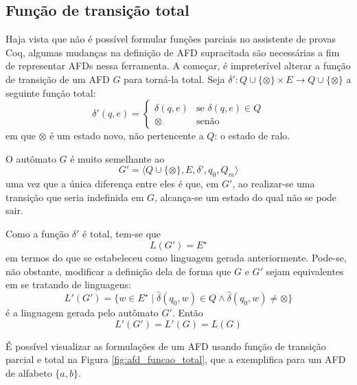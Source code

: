 \subsection{Função de transição total}

Haja vista que não é possível formular funções parciais no assistente de provas Coq, algumas mudanças na definição de AFD supracitada são necessárias a fim de representar AFDs nessa ferramenta. A começar, é impreterível alterar a função de transição de um AFD $G$ para torná-la total. Seja $\delta' : Q \cup \{ \otimes \} \times E \rightarrow Q \cup \{ \otimes \}$ a seguinte função total: $$\delta'(q, e) = \begin{cases}
\delta(q, e) & \text{se $\delta(q, e) \in Q$} \\
\otimes & \text{senão}
\end{cases}$$ em que $\otimes$ é um estado novo, não pertencente a $Q$: o estado de ralo.

O autômato $G$ é muito semelhante ao $$G' = \langle Q \cup \{ \otimes \}, E, \delta', q_0, Q_m \rangle$$ uma vez que a única diferença entre eles é que, em $G'$, ao realizar-se uma transição que seria indefinida em $G$, alcança-se um estado do qual não se pode sair.

Como a função $\delta'$ é total, tem-se que $$L(G') = E^\star$$ em termos do que se estabeleceu como linguagem gerada anteriormente. Pode-se, não obstante, modificar a definição dela de forma que $G$ e $G'$ sejam equivalentes em se tratando de linguagens: \begin{equation}
\label{eq:ling_ralo}
L'(G') = \{ w \in E^\star \mid \hat{\delta}(q_0, w) \in Q \wedge \hat{\delta}(q_0, w) \neq \otimes \}
\end{equation} é a linguagem gerada pelo autômato $G'$. Então $$L'(G') = L'(G) = L(G)$$

É possível visualizar as formulações de um AFD usando função de transição parcial e total na Figura \ref{fig:afd_funcao_total}, que a exemplifica para um AFD de alfabeto $\{ a, b \}$.


